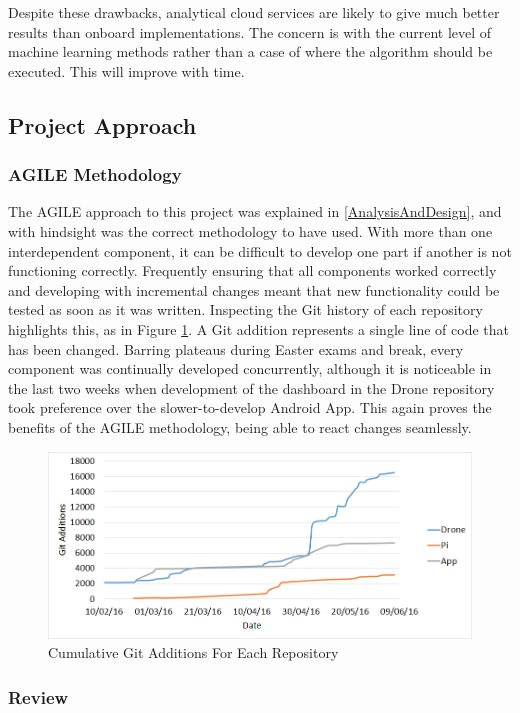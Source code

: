 \documentclass{article}
\begin{document}
Despite these drawbacks, analytical cloud services are likely to give much better results than onboard implementations. The concern is with the current level of machine learning methods rather than a case of where the algorithm should be executed. This will improve with time.

\subsection{Project Approach}
\subsubsection{AGILE Methodology}
The AGILE approach to this project was explained in \ref{AnalysisAndDesign}, and with hindsight was the correct methodology to have used. With more than one interdependent component, it can be difficult to develop one part if another is not functioning correctly. Frequently ensuring that all components worked correctly and developing with incremental changes meant that new functionality could be tested as soon as it was written. Inspecting the Git history of each repository highlights this, as in Figure \ref{fig:GitAnalysis}. A Git addition represents a single line of code that has been changed. Barring plateaus during Easter exams and break, every component was continually developed concurrently, although it is noticeable in the last two weeks when development of the dashboard in the Drone repository took preference over the slower-to-develop Android App. This again proves the benefits of the AGILE methodology, being able to react changes seamlessly.

\begin{figure}[h]
\centering
\caption{Cumulative Git Additions For Each Repository\label{fig:GitAnalysis}}
\includegraphics[width=\textwidth]{GitAnalysis}
\end{figure}


\subsubsection{Review}
\end{document}
